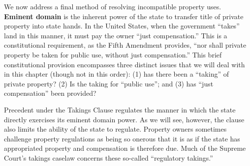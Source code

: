 We now address a final method of resolving incompatible property uses.
\textbf{Eminent domain} is the inherent power of the state to transfer title of
private property into state hands. In the United States, when the government
``takes'' land in this manner, it must pay the owner ``just compensation.'' This
is a constitutional requirement, as the Fifth Amendment provides, ``nor shall
private property be taken for public use, without just compensation.'' This
brief constitutional provision encompasses three distinct issues that we will
deal with in this chapter (though not in this order): (1) has there been a
``taking'' of private property? (2) Is the taking for ``public use''; and (3)
has ``just compensation'' been provided?

Precedent under the Takings Clause regulates the manner in which the state
directly exercises its eminent domain power. As we will see, however, the clause
also limits the ability of the state to regulate. Property owners sometimes
challenge property regulations as being so onerous that it is as if the state
has appropriated property and compensation is therefore due. Much of the Supreme
Court's takings caselaw concerns these so-called ``regulatory takings.''

